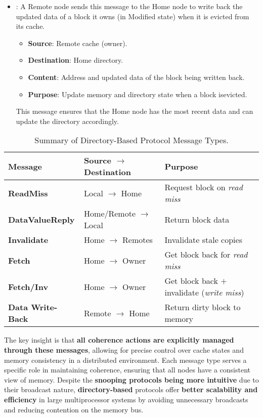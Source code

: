 \begin{itemize}
    \item {}: A Remote node sends this message to the Home node to write back the updated data of a block it owns (in Modified state) when it is evicted from its cache.
    \begin{itemize}
        \item[\textcolor{Green3}{\faIcon{arrow-right}}] \textcolor{Green3}{\textbf{Source}}: Remote cache (owner).
        \item[\textcolor{Green3}{\faIcon{arrow-left}}] \textcolor{Green3}{\textbf{Destination}}: Home directory.
        \item[\textcolor{Green3}{\faIcon{file-alt}}] \textcolor{Green3}{\textbf{Content}}: Address and updated data of the block being written back.
        \item[\textcolor{Green3}{\faIcon{question-circle}}] \textcolor{Green3}{\textbf{Purpose}}: Update memory and directory state when a block is\break evicted.
    \end{itemize}
    This message ensures that the Home node has the most recent data and can update the directory accordingly.
\end{itemize}

\begin{table}[!htp]
    \centering
    \begin{tabular}{@{} l l p{10em} @{}}
        \toprule
        Message & Source $\to$ Destination & Purpose \\
        \midrule
        \textbf{ReadMiss} & Local $\to$ Home & Request block on \emph{read miss} \\[.3em]
        \textbf{DataValueReply} & Home/Remote $\to$ Local & Return block data \\[.3em]
        \textbf{Invalidate} & Home $\to$ Remotes & Invalidate stale copies \\[.3em]
        \textbf{Fetch} & Home $\to$ Owner & Get block back for \emph{read miss} \\[.3em]
        \textbf{Fetch/Inv} & Home $\to$ Owner & Get block back $+$ invalidate (\emph{write miss}) \\[.3em]
        \textbf{Data Write-Back} & Remote $\to$ Home & Return dirty block to memory \\
        \bottomrule
    \end{tabular}
    \caption{Summary of Directory-Based Protocol Message Types.}
\end{table}

\highspace
The key insight is that \textbf{all coherence actions are explicitly managed through these messages}, allowing for precise control over cache states and memory consistency in a distributed environment. Each message type serves a specific role in maintaining coherence, ensuring that all nodes have a consistent view of memory. Despite the \textbf{snooping protocols being more intuitive} due to their broadcast nature, \textbf{directory-based} protocols offer \textbf{better scalability and efficiency} in large multiprocessor systems by avoiding unnecessary broadcasts and reducing contention on the memory bus.
